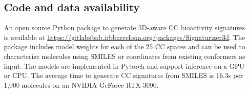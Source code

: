 \subsection{Code and data availability}
\label{Stereoisomers_Code}

An open source Python package to generate 3D-aware CC bioactivity signatures is available at \href{https://gitlabsbnb.irbbarcelona.org/packages/Signaturizer3d}{https://gitlabsbnb.irbbarcelona.org/packages/Signaturizer3d}. The package includes model weights for each of the 25 CC spaces and can be used to characterize molecules using SMILES or coordinates from existing conformers as input. The models are implemented in Pytorch and support inference on a GPU or CPU. The average time to generate CC signatures from SMILES is 16.3s per 1,000 molecules on an NVIDIA GeForce RTX 3090.

